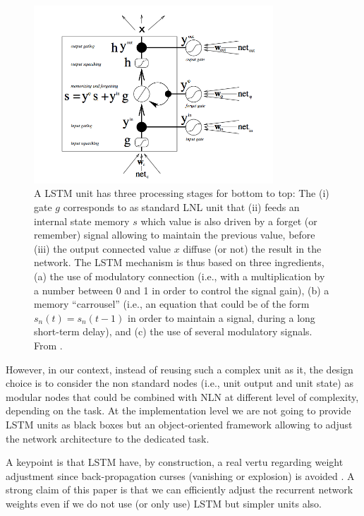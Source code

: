 \begin{figure}[!ht]
  \includegraphics[width=0.8\textwidth]{img/lstm-unit}
  \caption{A LSTM unit has three processing stages for bottom to top: The (i) gate $g$ corresponds to as standard LNL unit that (ii) feeds an internal state memory $s$ which value is also driven by a forget (or remember) signal allowing to maintain the previous value, before (iii) the output connected value $x$ diffuse (or not) the result in the network. The LSTM mechanism is thus based on three ingredients, (a) the use of modulatory connection (i.e., with a multiplication by a number between 0 and 1 in order to control the signal gain), (b) a memory ``carrousel'' (i.e., an equation that could be of the form $s_n(t) = s_n(t-1)$ in order to maintain a signal, during a long short-term delay), and (c) the use of several modulatory signals. From \cite{Hochreiter:1997}.}
  \label{lstm-unit}
\end{figure}

However, in our context, instead of reusing such a complex unit as it, the design choice is to consider the non standard nodes (i.e., unit output and unit state) as modular nodes that could be combined with NLN at different level of complexity, depending on the task. At the implementation level we are not going to provide LSTM units as black boxes but an object-oriented framework allowing to adjust the network architecture to the dedicated task.

A keypoint is that LSTM have, by construction, a real vertu regarding weight adjustment since back-propagation curses (vanishing or explosion) is avoided \cite{Schmidhuber:2015}. A strong claim of this paper is that we can efficiently adjust the recurrent network weights even if we do not use (or only use) LSTM but simpler units also.


